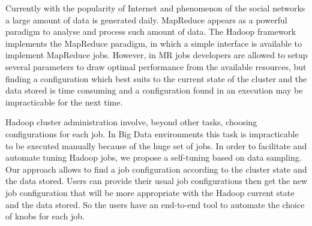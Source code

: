 Currently with the popularity of Internet and phenomenon of the social
networks a large amount of data is generated daily. MapReduce appears as a
powerful paradigm to analyse and process such amount of data. The Hadoop framework
implements the MapReduce paradigm, in which a simple interface is available to
implement MapReduce jobs. However, in MR jobs developers are allowed to setup several
parameters to draw optimal performance from the available resources, but finding
a configuration which best suits to the current state of the cluster and the data
stored is time consuming and a configuration found in an execution may be impracticable
for the next time.

Hadoop cluster administration involve, beyond other tasks, choosing configurations
for each job. In Big Data environments this task is impracticable to be executed
manually because of the huge set of jobs. In order to facilitate and automate tuning
Hadoop jobs, we propose a self-tuning based on data sampling. Our approach allows
to find a job configuration according to the cluster state and the data stored.
Users can provide their usual job configurations then get the new job configuration
that will be more appropriate with the Hadoop current state and the data stored.
So the users have an end-to-end tool to automate the choice of knobs for each job.
